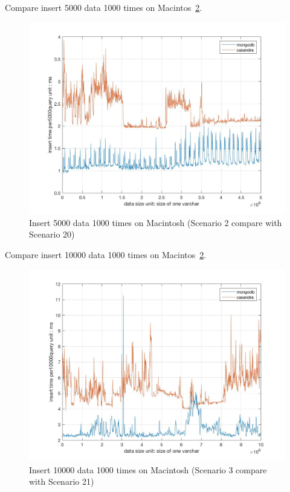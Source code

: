 Compare insert 5000 data 1000 times on Macintos~\ref{f:fly}.

\begin{figure}[!ht]
  \centering\includegraphics[width=\columnwidth]
  {images/insert_comp_5000.jpg}
  \caption{Insert 5000 data 1000 times on Macintosh
    (Scenario 2 compare with Scenario 20)}\label{f:fly}
\end{figure}

Compare insert 10000 data 1000 times on Macintos~\ref{f:fly}.

\begin{figure}[!ht]
  \centering\includegraphics[width=\columnwidth]
  {images/insert_comp_10000.jpg}
  \caption{Insert 10000 data 1000 times on Macintosh
    (Scenario 3 compare with Scenario 21)}\label{f:fly}
\end{figure}

